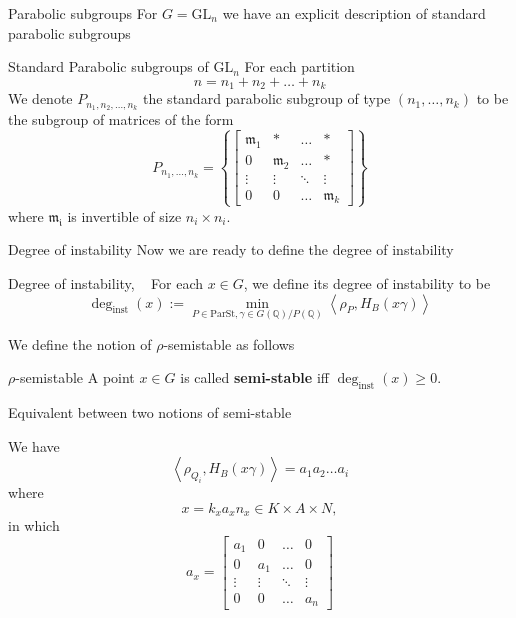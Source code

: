 \documentclass[pdf]{beamer}
\newcommand\Mycite[1]{%
  \citeauthor{#1}~}
\begin{document}
\begin{frame}{Parabolic subgroups}
    For $G =\text{GL}_n$ we have an explicit description of standard parabolic subgroups
    \pause\begin{block}{Standard Parabolic subgroups of $\text{GL}_n$}
        For each partition
        $$n = n_1+n_2+\ldots+n_k$$
        We denote $P_{n_1,n_2,\ldots,n_k}$ the standard parabolic subgroup of type $(n_1,\ldots, n_k)$ to be the subgroup of
        matrices of the form
        \[P_{n_1,\ldots, n_k} = \left\lbrace \begin{bmatrix}
                \mathfrak{m}_1 & \ast           & \ldots & \ast           \\
                0              & \mathfrak{m}_2 & \ldots & \ast           \\
                \vdots         & \vdots         & \ddots & \vdots         \\
                0              & 0              & \ldots & \mathfrak{m}_k
            \end{bmatrix} \right\rbrace\]
        where $\mathfrak{m_i}$ is invertible of size $n_i \times n_i$.
    \end{block}
\end{frame}
\begin{frame}{Degree of instability}
    Now we are ready to define the degree of instability
    \begin{block}{Degree of instability, \Mycite{chaudouard2016variante}}
        For each $x \in G$, we define its degree of instability to be
        \[\deg_{\text{inst}}(x):= \min_{P \in \text{ParSt}, \gamma \in G(\mathbb{Q})/P(\mathbb{Q})}\left\langle\rho_P, H_B(x\gamma) \right\rangle \]
    \end{block}\pause
    We define the notion of $\rho$-semistable as follows
    \begin{block}{$\rho$-semistable}
        A point $x \in G$ is called \textbf{semi-stable} iff $\deg_{\text{inst}}(x) \ge 0$.
    \end{block}
\end{frame}
\begin{frame}{Equivalent between two notions of semi-stable}

    We have
    \[\left\langle \rho_{Q_i}, H_B(x\gamma)   \right\rangle = a_1a_2\ldots a_i\]\pause
    where
    \[x = k_xa_xn_x \in K \times A \times N,\]
    in which
    \[a_x = \begin{bmatrix}
            a_1    & 0      & \ldots & 0      \\
            0      & a_1    & \ldots & 0      \\
            \vdots & \vdots & \ddots & \vdots \\
            0      & 0      & \ldots & a_n
        \end{bmatrix}\]
\end{frame}
\end{document}

